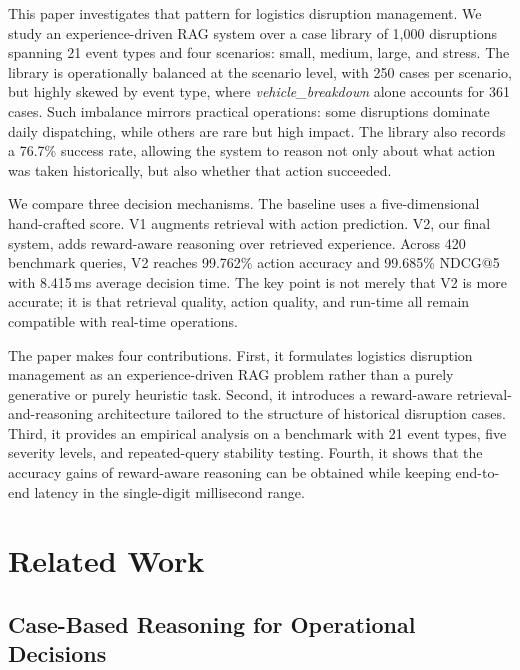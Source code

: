 \documentclass[conference]{IEEEtran}
\begin{document}
This paper investigates that pattern for logistics disruption management. We study an experience-driven RAG system over a case library of 1,000 disruptions spanning 21 event types and four scenarios: small, medium, large, and stress. The library is operationally balanced at the scenario level, with 250 cases per scenario, but highly skewed by event type, where \textit{vehicle\_breakdown} alone accounts for 361 cases. Such imbalance mirrors practical operations: some disruptions dominate daily dispatching, while others are rare but high impact. The library also records a 76.7\% success rate, allowing the system to reason not only about what action was taken historically, but also whether that action succeeded.

We compare three decision mechanisms. The baseline uses a five-dimensional hand-crafted score. V1 augments retrieval with action prediction. V2, our final system, adds reward-aware reasoning over retrieved experience. Across 420 benchmark queries, V2 reaches 99.762\% action accuracy and 99.685\% NDCG@5 with 8.415\,ms average decision time. The key point is not merely that V2 is more accurate; it is that retrieval quality, action quality, and run-time all remain compatible with real-time operations.

The paper makes four contributions. First, it formulates logistics disruption management as an experience-driven RAG problem rather than a purely generative or purely heuristic task. Second, it introduces a reward-aware retrieval-and-reasoning architecture tailored to the structure of historical disruption cases. Third, it provides an empirical analysis on a benchmark with 21 event types, five severity levels, and repeated-query stability testing. Fourth, it shows that the accuracy gains of reward-aware reasoning can be obtained while keeping end-to-end latency in the single-digit millisecond range.

\section{Related Work}
\label{sec:related_work}

\subsection{Case-Based Reasoning for Operational Decisions}
\end{document}
